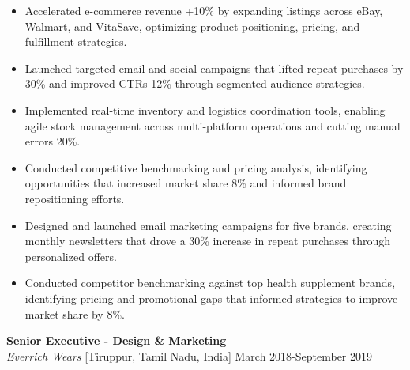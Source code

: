 \documentclass[10pt,letterpaper]{article}
\newcommand{\jobheader}[3]{\textit{#1} \hfill #2 \hfill #3}
\begin{document}
\begin{itemize}
\item Accelerated e-commerce revenue +10\% by expanding listings across eBay, Walmart, and VitaSave, optimizing product positioning, pricing, and fulfillment strategies.
\item Launched targeted email and social campaigns that lifted repeat purchases by 30\% and improved CTRs 12\% through segmented audience strategies.
\item Implemented real-time inventory and logistics coordination tools, enabling agile stock management across multi-platform operations and cutting manual errors 20\%.
\item Conducted competitive benchmarking and pricing analysis, identifying opportunities that increased market share 8\% and informed brand repositioning efforts.
\item Designed and launched email marketing campaigns for five brands, creating monthly newsletters that drove a 30\% increase in repeat purchases through personalized offers.
\item Conducted competitor benchmarking against top health supplement brands, identifying pricing and promotional gaps that informed strategies to improve market share by 8\%.
\end{itemize}

\vspace{6pt}

\textbf{Senior Executive - Design \& Marketing}\\
\jobheader{Everrich Wears}{[Tiruppur, Tamil Nadu, India]}{March 2018-September 2019}
\end{document}
